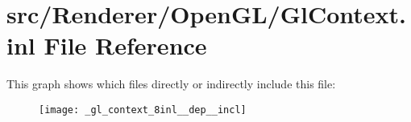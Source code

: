\hypertarget{_gl_context_8inl}{\section{src/\+Renderer/\+Open\+G\+L/\+Gl\+Context.inl File Reference}
\label{_gl_context_8inl}
}
This graph shows which files directly or indirectly include this file\+:\nopagebreak
\begin{figure}[H]
\begin{center}
\leavevmode
\texttt{[image: \_gl\_context\_8inl\_\_dep\_\_incl]}
\end{center}
\end{figure}
